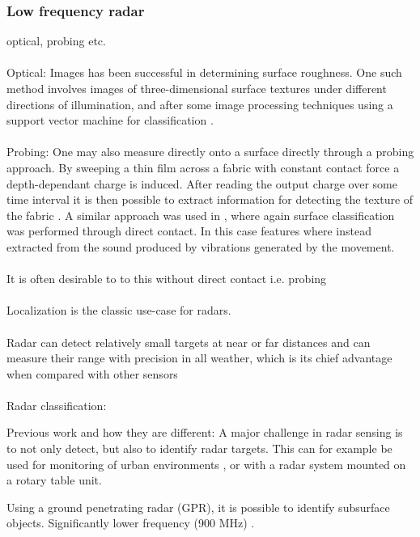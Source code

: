 \subsubsection{Low frequency radar}



optical, probing etc.
\\ \\
\noindent Optical: Images has been successful in determining surface roughness. One such method involves images of three-dimensional surface textures under different directions of illumination, and after some image processing techniques using a support vector machine for classification \citep{dong_duan_yang_2008}. 
\\ \\
\noindent Probing: One may also measure directly onto a surface directly through a probing approach. By sweeping a thin film across a fabric with constant contact force a depth-dependant charge is induced. After reading the output charge over some time interval it is then possible to extract information for detecting the texture of the fabric \citep{song_han_hu_li_2014}. A similar approach was used in \citep{strese_schuwerk_iepure_steinbach_2017}, where again surface classification was performed through direct contact. In this case features where instead extracted from the sound produced by vibrations generated by the movement. 
\\ \\
It is often desirable to to this without direct contact i.e. probing
\\ \\
Localization is the classic use-case for radars. 
\\ \\
 Radar  can detect relatively small targets at near or far distances and can measure their range with  precision  in  all weather,  which is  its chief  advantage when compared with other  sensors \citep{skolnik}
\\ \\
Radar classification: 

Previous work and how they are different: A major challenge in radar sensing is to not only detect, but also to identify radar targets. This can for example be used for monitoring of urban environments \citep{harter_kowalewski_sit_jalilvand_ziroff_zwick_2014}, or with a radar system mounted on a rotary table unit. 

Using a ground penetrating radar (GPR), it is possible to identify subsurface objects. 
Significantly lower frequency (900 MHz)
\citep{lu_pu_liu_2014}.
\citep{daniels_2004}

